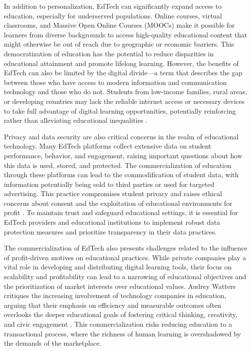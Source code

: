 \begin{refsection}
In addition to personalization, EdTech can significantly expand access to education, especially for underserved populations. Online courses, virtual classrooms, and Massive Open Online Courses (MOOCs) make it possible for learners from diverse backgrounds to access high-quality educational content that might otherwise be out of reach due to geographic or economic barriers. This democratization of education has the potential to reduce disparities in educational attainment and promote lifelong learning. However, the benefits of EdTech can also be limited by the digital divide—a term that describes the gap between those who have access to modern information and communication technology and those who do not. Students from low-income families, rural areas, or developing countries may lack the reliable internet access or necessary devices to take full advantage of digital learning opportunities, potentially reinforcing rather than alleviating educational inequalities \cite[pp.~56-59]{selwyn2014everyday}. 

Privacy and data security are also critical concerns in the realm of educational technology. Many EdTech platforms collect extensive data on student performance, behavior, and engagement, raising important questions about how this data is used, stored, and protected. The commercialization of education through these platforms can lead to the commodification of student data, with information potentially being sold to third parties or used for targeted advertising. This practice compromises student privacy and raises ethical concerns about consent and the exploitation of educational environments for profit \cite[pp.~88-91]{williamson2017bigdata}. To maintain trust and safeguard educational settings, it is essential for EdTech providers and educational institutions to implement robust data protection measures and prioritize transparency in their data practices.

The commercialization of EdTech also presents challenges related to the influence of profit-driven motives on educational practices. While private companies play a vital role in developing and distributing digital learning tools, their focus on scalability and profitability can lead to a narrowing of educational objectives and the prioritization of market interests over educational values. Audrey Watters critiques the increasing involvement of technology companies in education, arguing that their emphasis on efficiency and measurable outcomes often overlooks the deeper educational goals of fostering critical thinking, creativity, and civic engagement \cite[pp.~56-59]{watters2023teachingmachines}. This commercialization risks reducing education to a transactional process, where the richness of human learning is overshadowed by the demands of the marketplace.


\end{refsection}
